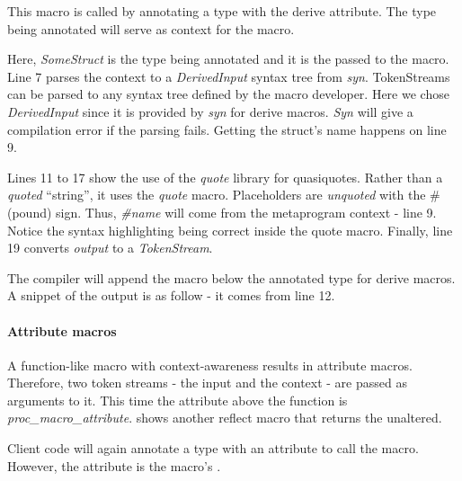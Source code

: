 This macro is called by annotating a type with the derive attribute.
The type being annotated will serve as context for the macro.


Here, \textit{SomeStruct} is the type being annotated and it is the  passed to the macro.
Line 7 parses the context to a \textit{DerivedInput} syntax tree from \textit{syn}.
TokenStreams can be parsed to any syntax tree defined by the macro developer.
Here we chose \textit{DerivedInput} since it is provided by \textit{syn} for derive macros.
\textit{Syn} will give a compilation error if the parsing fails.
Getting the struct's name happens on line 9.

Lines 11 to 17 show the use of the \textit{quote} library for quasiquotes.
Rather than a \textit{quoted} ``string'', it uses the \textit{quote} macro.
Placeholders are \textit{unquoted} with the \# (pound) sign.
Thus, \textit{\#name} will come from the metaprogram context - line 9.
Notice the syntax highlighting being correct inside the quote macro.
Finally, line 19 converts \textit{output} to a \textit{TokenStream}.

The compiler will append the macro  below the annotated type for derive macros.
A snippet of the output is as follow - it comes from line 12.


\paragraph{Attribute macros}
A function-like macro with context-awareness results in attribute macros.
Therefore, two token streams - the input and the context - are passed as arguments to it.
This time the attribute above the function is \textit{proc\_macro\_attribute}.
 shows another reflect macro that returns the  unaltered.


Client code will again annotate a type with an attribute to call the macro.
However, the attribute is the macro's .


